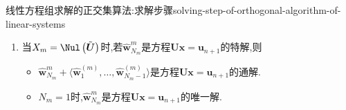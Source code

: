 \begin{theorem}{线性方程组求解的正交集算法:求解步骤}{solving-step-of-orthogonal-algorithm-of-linear-systems}
\begin{enumerate}
\begin{itemize}
			\item 存在$1\leq k<N_{i-1}$使得$t_{k}^{\left(i\right)}\neq 0$.此时$N_{i}=N_{i-1}-1$,对任一$1\leq j\neq k\leq N_{i-1}$有
			\begin{align*}
				\boldsymbol{w}_{j}^{\left(i\right)}=\boldsymbol{w}_{j}^{\left(i-1\right)}-t_{j}^{\left(i\right)}\left(t_{k}^{\left(i\right)}\right)^{-1}\boldsymbol{w}_{k}^{\left(i-1\right)}.
			\end{align*}
		\end{itemize}
		\item 当$X_{m}=\Nul\left(\tilde{\boldsymbol{U}}\right)$时,若$\hat{\boldsymbol{w}}_{N_{m}}^{m}$是方程$\boldsymbol{U}\boldsymbol{x}=\boldsymbol{u}_{n+1}$的特解,则
		\begin{itemize}
			\item $\hat{\boldsymbol{w}}_{N_{m}}^{m}+\langle\hat{\boldsymbol{w}}_{1}^{\left(m\right)},\ldots,\hat{\boldsymbol{w}}_{N_{m}-1}^{\left(m\right)}\rangle$是方程$\boldsymbol{U}\boldsymbol{x}=\boldsymbol{u}_{n+1}$的通解.
			\item $N_{m}=1$时,$\hat{\boldsymbol{w}}_{N_{m}}^{m}$是方程$\boldsymbol{U}\boldsymbol{x}=\boldsymbol{u}_{n+1}$的唯一解.
		\end{itemize}
	\end{enumerate}
\end{theorem}

